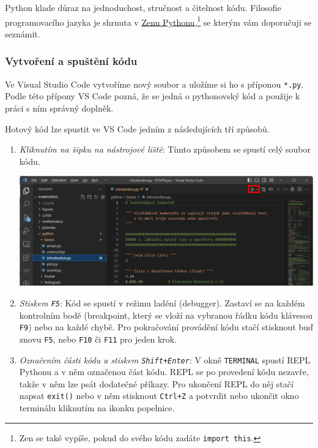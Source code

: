 \documentclass[a4paper,11pt,twoside]{article}
\def\code#1{\textnormal{\texttt{#1}}}
\def\abbreviation#1{\textnormal{\textsc{#1}}}
\theoremstyle{red}
\theoremstyle{green}
\begin{document}
    Python klade důraz na jednoduchost, stručnost a čitelnost kódu.
    Filosofie programovacího jazyka je shrnuta v \href{https://www.python.org/dev/peps/pep-0020/}{Zenu Pythonu},\footnote{
        Zen se také vypíše, pokud do svého kódu zadáte \code{import this}.
    } se kterým vám doporučuji se seznámit.

\subsubsection{Vytvoření a spuštění kódu}
    Ve Visual Studio Code vytvoříme nový soubor a uložíme si ho s příponou \code{*.py}. 
    Podle této přípony VS Code pozná, že se jedná o pythonovský kód a použije k práci s ním správný doplněk.
       
    Hotový kód lze spustit ve VS Code jedním z následujících tří způsobů.
    \begin{enumerate}
        \item 
            \emph{Kliknutím na šipku na nástrojové liště}:
            Tímto způsobem se spustí celý soubor kódu.
            \begin{center}\includegraphics[width=\linewidth]{PythonRun.png}\end{center}
        \item
            \emph{Stiskem \code{F5}}: Kód se spustí v režimu ladění (debugger).
            Zastaví se na každém kontrolním bodě (breakpoint, který se vloží na vybranou řádku kódu klávesou \code{F9}) nebo na každé chybě.
            Pro pokračování provádění kódu stačí stisknout buď znovu \code{F5}, nebo \code{F10} či \code{F11} pro jeden krok.

        \item
            \emph{Označením části kódu a stiskem \code{Shift+Enter}}: V okně \code{TERMINAL} spustí \abbreviation{REPL} Pythonu a v něm označenou část kódu.
            \abbreviation{REPL} se po provedení kódu nezavře, takže v něm lze psát dodatečné příkazy.
            Pro ukončení \abbreviation{REPL} do něj stačí napsat \code{exit()} nebo v něm stisknout \code{Ctrl+Z} a potvrdit nebo ukončit okno terminálu kliknutím na ikonku popelnice.
    \end{enumerate}
\end{document}
